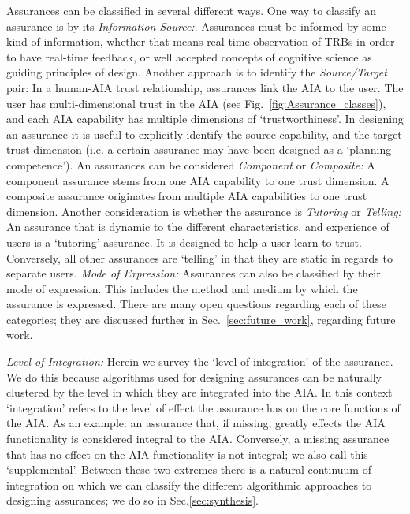 Assurances can be classified in several different ways. One way to classify an assurance is by its \emph{Information Source:}. Assurances must be informed by some kind of information, whether that means real-time observation of TRBs in order to have real-time feedback, or well accepted concepts of cognitive science as guiding principles of design.
Another approach is to identify the \emph{Source/Target} pair: In a human-AIA trust relationship, assurances link the AIA to the user. The user has multi-dimensional trust in the AIA (see Fig.~\ref{fig:Assurance_classes}), and each AIA capability has multiple dimensions of `trustworthiness'. In designing an assurance it is useful to explicitly identify the source capability, and the target trust dimension (i.e. a certain assurance may have been designed as a `planning-competence').
An assurances can be considered \emph{Component} or \emph{Composite:} A component assurance stems from one AIA capability to one trust dimension. A composite assurance originates from multiple AIA capabilities to one trust dimension.
Another consideration is whether the assurance is \emph{Tutoring} or \emph{Telling:} An assurance that is dynamic to the different characteristics, and experience of users is a `tutoring' assurance. It is designed to help a user learn to trust. Conversely, all other assurances are `telling' in that they are static in regards to separate users.
\emph{Mode of Expression:} Assurances can also be classified by their mode of expression. This includes the method and medium by which the assurance is expressed.
There are many open questions regarding each of these categories; they are discussed further in Sec.~\ref{sec:future_work}, regarding future work.

\emph{Level of Integration:} Herein we survey the `level of integration' of the assurance. We do this because algorithms used for designing assurances can be naturally clustered by the level in which they are integrated into the AIA. In this context `integration' refers to the level of effect the assurance has on the core functions of the AIA. As an example: an assurance that, if missing, greatly effects the AIA functionality is considered integral to the AIA. Conversely, a missing assurance that has no effect on the AIA functionality is not integral; we also call this `supplemental'. Between these two extremes there is a natural continuum of integration on which we can classify the different algorithmic approaches to designing assurances; we do so in Sec.\ref{sec:synthesis}.
